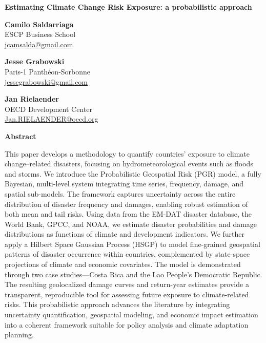 
\begin{titlepage}
\raggedright

{\fontsize{36pt}{40pt}\selectfont\bfseries\color{OECDblue}
Estimating Climate Change Risk Exposure: a probabilistic approach\par}

\vspace{2cm}

\raggedleft
\setlength{\parskip}{0.3em}

\textbf{Camilo Saldarriaga}\\
ESCP Business School\\
\href{mailto:jcamsalda@gmail.com}{jcamsalda@gmail.com}

\vspace{1.5em}

\textbf{Jesse Grabowski}\\
Paris-1 Panth\'{e}on-Sorbonne\\
\href{mailto:jessegrabowski@gmail.com}{jessegrabowski@gmail.com}

\vspace{1.5em}

\textbf{Jan Rielaender}\\
OECD Development Center\\
\href{mailto:Jan.RIELAENDER@oecd.org}{Jan.RIELAENDER@oecd.org}

\vspace{2cm}

\raggedright
\textbf{Abstract}

\justifying
This paper develops a methodology to quantify countries' exposure to climate change--related disasters, focusing on hydrometeorological events such as floods and storms. We introduce the Probabilistic Geospatial Risk (PGR) model, a fully Bayesian, multi-level system integrating time series, frequency, damage, and spatial sub-models. The framework captures uncertainty across the entire distribution of disaster frequency and damages, enabling robust estimation of both mean and tail risks. Using data from the EM-DAT disaster database, the World Bank, GPCC, and NOAA, we estimate disaster probabilities and damage distributions as functions of climate and development indicators. We further apply a Hilbert Space Gaussian Process (HSGP) to model fine-grained geospatial patterns of disaster occurrence within countries, complemented by state-space projections of climate and economic covariates. The model is demonstrated through two case studies---Costa Rica and the Lao People's Democratic Republic. The resulting geolocalized damage curves and return-year estimates provide a transparent, reproducible tool for assessing future exposure to climate-related risks. This probabilistic approach advances the literature by integrating uncertainty quantification, geospatial modeling, and economic impact estimation into a coherent framework suitable for policy analysis and climate adaptation planning.


\end{titlepage}
